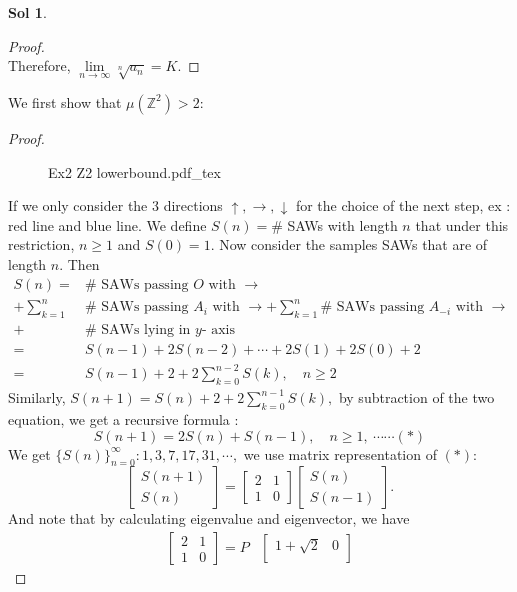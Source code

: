 \documentclass[12pt,a4paper]{report}
\theoremstyle{definition}
\newtheorem*{sol}{Sol}
\newcommand{\incfig}[1]{%
{#1.pdf_tex}
}
\begin{document}
\begin{sol}
\begin{proof}
\[	\]
	Therefore, $\lim\limits_{n\to\infty}\sqrt[n]{a_n}=K.$
	\end{proof}
	\newpage
	We first show that $\mu(\mathbb{Z}^2)>2$:
	\begin{proof}
		\begin{figure}[htp]
		\centering
		\def\svgwidth{8cm}
		\incfig{Ex2 Z2 lowerbound}
		\end{figure}
		If we only consider the 3 directions $\uparrow,\rightarrow,\downarrow$ for the choice of the next step, ex : red line and blue line. We define $S(n)=\#$ SAWs with length $n$ that under this restriction, $n\geq 1$ and $S(0)=1.$ Now consider the samples SAWs that are of length $n$. Then 
		\begin{align*}
	    	S(n)=&\#\mbox{ SAWs passing } O\mbox{ with } \rightarrow\\
	    	+\sum_{k=1}^n &\#\mbox{ SAWs passing } A_i\mbox{ with } \rightarrow + \sum_{k=1}^n \#\mbox{ SAWs passing } A_{-i}\mbox{ with } \rightarrow\\
	    	+&\#\mbox{ SAWs lying in } y\mbox{- axis}\\
	    	=& S(n-1)+2S(n-2)+\cdots +2S(1)+2S(0)+2\\
	    	=&S(n-1)+2+2\sum_{k=0}^{n-2}S(k),\quad n\geq 2
	    \end{align*}
	    Similarly, $S(n+1)=S(n)+2+2\sum\limits_{k=0}^{n-1}S(k),$ by subtraction of the two equation, we get a recursive formula :
	    \[
	    S(n+1)=2S(n)+S(n-1),\quad n\geq 1,\ \cdots\cdots(*)
	    \]
	    We get $\{S(n)\}_{n=0}^\infty:1,3,7,17,31,\cdots,$ we use matrix representation of $(*):$
	    \[
	    \begin{bmatrix}
	    S(n+1)\\
	    S(n)
	    \end{bmatrix}=\begin{bmatrix}
	    2 & 1\\
	    1 & 0
	    \end{bmatrix}\begin{bmatrix}
	    S(n)\\
	    S(n-1)
	    \end{bmatrix}.
	    \]
	    And note that by calculating eigenvalue and eigenvector, we have 
	    \begin{align*}
	    \begin{bmatrix}
	    2 & 1\\
	    1 & 0
	    \end{bmatrix}=P&\begin{bmatrix}
	    1+\sqrt{2} & 0\\

\end{bmatrix}
\end{align*}
\end{proof}
\end{sol}
\end{document}
